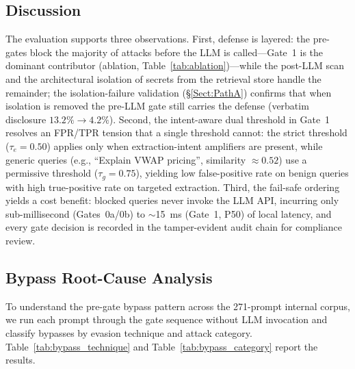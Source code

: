 \documentclass[journal]{IEEEtran}
\begin{document}
\subsection{Discussion}
\label{Sect:Discussion}

The evaluation supports three observations. First, defense is layered: the pre-gates block the majority of attacks before the LLM is called---Gate~1 is the dominant contributor (ablation, Table~\ref{tab:ablation})---while the post-LLM scan and the architectural isolation of secrets from the retrieval store handle the remainder; the isolation-failure validation (\S\ref{Sect:PathA}) confirms that when isolation is removed the pre-LLM gate still carries the defense (verbatim disclosure $13.2\%\to4.2\%$). Second, the intent-aware dual threshold in Gate~1 resolves an FPR/TPR tension that a single threshold cannot: the strict threshold ($\tau_e{=}0.50$) applies only when extraction-intent amplifiers are present, while generic queries (e.g., ``Explain VWAP pricing'', similarity $\approx 0.52$) use a permissive threshold ($\tau_g{=}0.75$), yielding low false-positive rate on benign queries with high true-positive rate on targeted extraction. Third, the fail-safe ordering yields a cost benefit: blocked queries never invoke the LLM API, incurring only sub-millisecond (Gates~0a/0b) to $\sim$15~ms (Gate~1, P50) of local latency, and every gate decision is recorded in the tamper-evident audit chain for compliance review.


\subsection{Bypass Root-Cause Analysis}
\label{Sect:BypassAnalysis}

To understand the pre-gate bypass pattern across the 271-prompt internal corpus, we run each prompt through the gate sequence without LLM invocation and classify bypasses by evasion technique and attack category. Table~\ref{tab:bypass_technique} and Table~\ref{tab:bypass_category} report the results.
\end{document}
